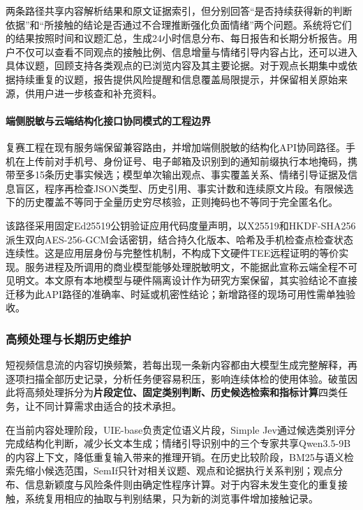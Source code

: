 两条路径共享内容解析结果和原文证据索引，但分别回答``是否持续获得新的判断依据''和``所接触的结论是否通过不合理推断强化负面情绪''两个问题。系统将它们的结果按照时间和议题汇总，生成24小时信息分布、每日报告和长期分析报告。用户不仅可以查看不同观点的接触比例、信息增量与情绪引导内容占比，还可以进入具体议题，回顾支持各类观点的已浏览内容及其主要论据。对于观点长期集中或依据持续重复的议题，报告提供风险提醒和信息覆盖局限提示，并保留相关原始来源，供用户进一步核查和补充资料。

\paragraph{端侧脱敏与云端结构化接口协同模式的工程边界}
复赛工程在现有服务端保留兼容路由，并增加端侧脱敏的结构化API协同路径。手机在上传前对手机号、身份证号、电子邮箱及识别到的通知前缀执行本地掩码，携带至多15条历史事实候选；模型单次输出观点、事实覆盖关系、情绪引导证据及信息盲区，程序再检查JSON类型、历史引用、事实计数和连续原文片段。有限候选下的历史覆盖不等同于全量历史穷尽核验，正则掩码也不等同于完全匿名化。

该路径采用固定Ed25519公钥验证应用代码度量声明，以X25519和HKDF-SHA256派生双向AES-256-GCM会话密钥，结合持久化版本、哈希及手机检查点检查状态连续性。这是应用层身份与完整性机制，不构成下文硬件TEE远程证明的等价实现。服务进程及所调用的商业模型能够处理脱敏明文，不能据此宣称云端全程不可见明文。本文原有本地模型与硬件隔离设计作为研究方案保留，其实验结论不直接迁移为此API路径的准确率、时延或机密性结论；新增路径的现场可用性需单独验收。

\subsubsection{高频处理与长期历史维护}\label{section:2.1.4}

短视频信息流的内容切换频繁，若每出现一条新内容都由大模型生成完整解释，再逐项扫描全部历史记录，分析任务便容易积压，影响连续体检的使用体验。破茧因此将高频处理拆分为\textbf{片段定位、固定类别判断、历史候选检索和指标计算}四类任务，让不同计算需求由适合的技术承担。

在当前内容处理阶段，UIE-base负责定位语义片段，Simple Jev通过候选类别评分完成结构化判断，减少长文本生成；情绪引导识别中的三个专家共享Qwen3.5-9B的内容上下文，降低重复输入带来的推理开销。在历史比较阶段，BM25与语义检索先缩小候选范围，SemIf只针对相关议题、观点和论据执行关系判别；观点分布、信息新颖度与风险条件则由确定性程序计算。对于内容未发生变化的重复接触，系统复用相应的抽取与判别结果，只为新的浏览事件增加接触记录。

